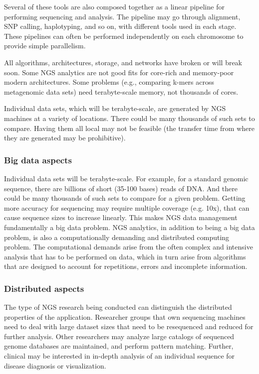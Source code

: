 Several of these tools are also composed together as a linear pipeline
for performing sequencing and analysis. The pipeline may go through
alignment, SNP calling, haplotyping, and so on, with different tools
used in each stage. These pipelines can often be performed
independently on each chromosome to provide simple parallelism.

All algorithms, architectures, storage, and networks have broken or
will break soon.  Some NGS analytics are not good fits for core-rich
and memory-poor modern architectures. Some problems (e.g., comparing
k-mers across metagenomic data sets) need terabyte-scale memory, not
thousands of cores.~\cite{ngs-gap}

Individual data sets, which will be terabyte-scale, are generated by
NGS machines at a variety of locations. There could be many thousands
of such sets to compare. Having them all local may not be feasible
(the transfer time from where they are generated may be prohibitive).

\subsubsection*{Big data aspects}

Individual data sets will be terabyte-scale. For example, for a
standard genomic sequence, there are billions of short (35-100 bases)
reads of DNA.  And there could be many thousands of such sets to
compare for a given problem.  Getting more accuracy for sequencing may
require multiple coverage (e.g. 10x), that can cause sequence sizes to
increase linearly.  This makes NGS data management fundamentally a big
data problem.  NGS analytics, in addition to being a big data problem,
is also a computationally demanding and distributed computing problem.
The computational demands arise from the often complex and intensive
analysis that has to be performed on data, which in turn arise from
algorithms that are designed to account for repetitions, errors and
incomplete information.

\subsubsection*{Distributed aspects}

The type of NGS research being conducted can distinguish the
distributed properties of the application. Researcher groups that
own sequencing machines need to deal with large dataset sizes that
need to be resequenced and reduced for further analysis. Other
researchers may analyze large catalogs of sequenced genome databases
are maintained, and perform pattern matching. Further, clinical may be
interested in in-depth analysis of an individual sequence for disease
diagnosis or visualization.

